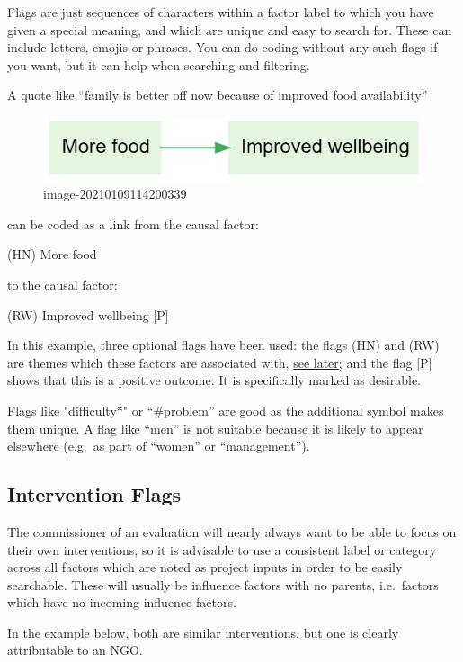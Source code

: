 \documentclass[
]{book}
\begin{document}
Flags are just sequences of characters within a factor label to which you have given a special meaning, and which are unique and easy to search for. These can include letters, emojis or phrases. You can do coding without any such flags if you want, but it can help when searching and filtering.

A quote like ``family is better off now because of improved food availability''

\begin{figure}
\centering
\includegraphics{_assets/image-20210109114200339.png}
\caption{image-20210109114200339}
\end{figure}

can be coded as a link from the causal factor:

(HN) More food

to the causal factor:

(RW) Improved wellbeing {[}P{]}

In this example, three optional flags have been used: the flags (HN) and (RW) are themes which these factors are associated with, \protect\hyperlink{intervention-flags}{see later}; and the flag {[}P{]} shows that this is a positive outcome. It is specifically marked as desirable.

Flags like "difficulty*" or ``\#problem'' are good as the additional symbol makes them unique. A flag like ``men'' is not suitable because it is likely to appear elsewhere (e.g.~as part of ``women'' or ``management'').

\hypertarget{intervention-flags}{%
\subsection{Intervention Flags}\label{intervention-flags}}

The commissioner of an evaluation will nearly always want to be able to focus on their own interventions, so it is advisable to use a consistent label or category across all factors which are noted as project inputs in order to be easily searchable. These will usually be influence factors with no parents, i.e.~factors which have no incoming influence factors.

In the example below, both are similar interventions, but one is clearly attributable to an NGO.
\end{document}
